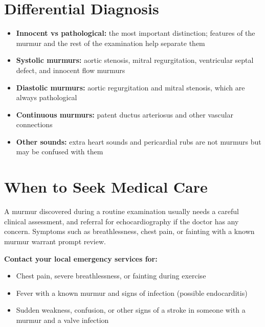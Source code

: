\section*{Differential Diagnosis}
\begin{itemize}
    \item \textbf{Innocent vs pathological:} the most important distinction; features of the murmur and the rest of the examination help separate them
    \item \textbf{Systolic murmurs:} aortic stenosis, mitral regurgitation, ventricular septal defect, and innocent flow murmurs
    \item \textbf{Diastolic murmurs:} aortic regurgitation and mitral stenosis, which are always pathological
    \item \textbf{Continuous murmurs:} patent ductus arteriosus and other vascular connections
    \item \textbf{Other sounds:} extra heart sounds and pericardial rubs are not murmurs but may be confused with them
\end{itemize}

\section*{When to Seek Medical Care}
A murmur discovered during a routine examination usually needs a careful clinical assessment, and referral for echocardiography if the doctor has any concern. Symptoms such as breathlessness, chest pain, or fainting with a known murmur warrant prompt review.

\textbf{Contact your local emergency services for:}
\begin{itemize}
    \item Chest pain, severe breathlessness, or fainting during exercise
    \item Fever with a known murmur and signs of infection (possible endocarditis)
    \item Sudden weakness, confusion, or other signs of a stroke in someone with a murmur and a valve infection
\end{itemize}

